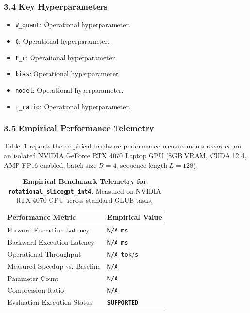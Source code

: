 \subsubsection*{3.4 Key Hyperparameters}
\begin{itemize}
    \item \texttt{W\_quant}: Operational hyperparameter.
    \item \texttt{Q}: Operational hyperparameter.
    \item \texttt{P\_r}: Operational hyperparameter.
    \item \texttt{bias}: Operational hyperparameter.
    \item \texttt{model}: Operational hyperparameter.
    \item \texttt{r\_ratio}: Operational hyperparameter.
\end{itemize}

\subsubsection*{3.5 Empirical Performance Telemetry}
Table~\ref{tab:telemetry_rotational\_slicegpt\_int4} reports the empirical hardware performance measurements recorded on an isolated NVIDIA GeForce RTX 4070 Laptop GPU (8GB VRAM, CUDA 12.4, AMP FP16 enabled, batch size $B=4$, sequence length $L=128$).

\begin{table}[h]
\centering
\small
\caption{\textbf{Empirical Benchmark Telemetry for \texttt{rotational\_slicegpt\_int4}}. Measured on NVIDIA RTX 4070 GPU across standard GLUE tasks.}
\label{tab:telemetry_rotational\_slicegpt\_int4}
\begin{tabularx}{\columnwidth}{lX}
\toprule
\textbf{Performance Metric} & \textbf{Empirical Value} \\
\midrule
Forward Execution Latency & \texttt{N/A ms} \\
Backward Execution Latency & \texttt{N/A ms} \\
Operational Throughput & \texttt{N/A tok/s} \\
Measured Speedup vs. Baseline & \texttt{N/A} \\
Parameter Count & \texttt{N/A} \\
Compression Ratio & \texttt{N/A} \\
Evaluation Execution Status & \textbf{\texttt{SUPPORTED}} \\
\bottomrule
\end{tabularx}
\end{table}

